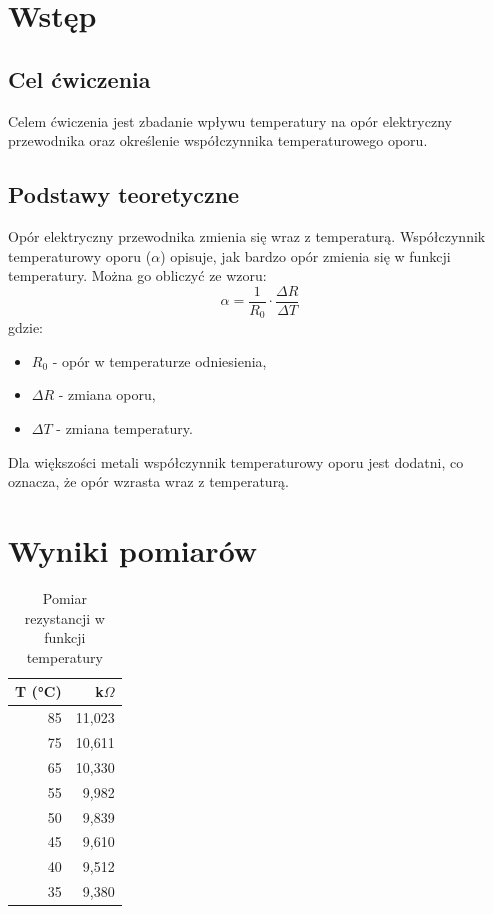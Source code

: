 \documentclass[11pt]{article}
\begin{document}
\section*{Wstęp}

\subsection*{Cel ćwiczenia}
Celem ćwiczenia jest zbadanie wpływu temperatury na opór elektryczny przewodnika oraz określenie współczynnika temperaturowego oporu.

\subsection*{Podstawy teoretyczne}
Opór elektryczny przewodnika zmienia się wraz z temperaturą. Współczynnik temperaturowy oporu (\(\alpha\)) opisuje, jak bardzo opór zmienia się w funkcji temperatury. Można go obliczyć ze wzoru:
\begin{equation}
    \alpha = \frac{1}{R_0} \cdot \frac{\Delta R}{\Delta T}
\end{equation}
gdzie:
\begin{itemize}
    \item \( R_0 \) - opór w temperaturze odniesienia,
    \item \( \Delta R \) - zmiana oporu,
    \item \( \Delta T \) - zmiana temperatury.
\end{itemize}

Dla większości metali współczynnik temperaturowy oporu jest dodatni, co oznacza, że opór wzrasta wraz z temperaturą.
\section*{Wyniki pomiarów}

\begin{table}[ht]
\centering
\footnotesize
\setlength{\tabcolsep}{4pt}
\caption{Pomiar rezystancji w funkcji temperatury}
\label{tab:method1}
\begin{tabular}{|r|r|}
\hline
\textbf{T (°C)} & \textbf{k$\Omega$} \\
\hline
85 & 11,023 \\
75 & 10,611 \\
65 & 10,330 \\
55 & 9,982 \\
50 & 9,839 \\
45 & 9,610 \\
40 & 9,512 \\
35 & 9,380 \\
\hline
\end{tabular}
\end{table}
\end{document}
